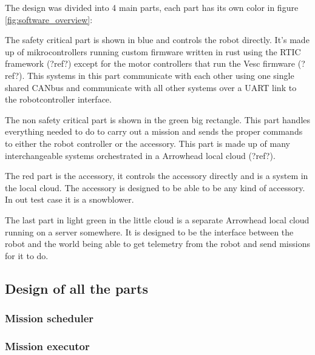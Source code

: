\documentclass[main.tex]{subfiles}
\begin{document}
The design was divided into 4 main parts, each part has its own color in figure \ref{fig:software_overview}:

The safety critical part is shown in blue and controls the robot directly. 
It's made up of mikrocontrollers running custom firmware written in rust using the RTIC framework (?ref?) except
for the motor controllers that run the Vesc firmware (?ref?).
This systems in this part communicate with each other using one single shared CANbus and communicate with all other systems over a UART link to the robotcontroller interface.

The non safety critical part is shown in the green big rectangle.
This part handles everything needed to do to carry out a mission and sends the proper commands to either the robot controller or the accessory. This part is made up of many interchangeable systems orchestrated in a Arrowhead local cloud (?ref?).

The red part is the accessory, it controls the accessory directly and is a system in the local cloud.
The accessory is designed to be able to be any kind of accessory. In out test case it is a snowblower.

The last part in light green in the little cloud is a separate Arrowhead local cloud running on a server somewhere. It is designed to be the interface between the robot and the world being able to get telemetry from the robot and send missions for it to do.

\subsection{Design of all the parts}

\subsubsection{Mission scheduler}

\subsubsection{Mission executor}
\end{document}
